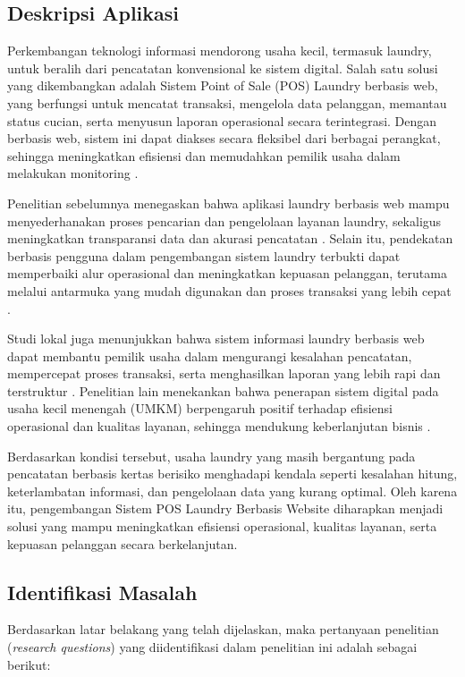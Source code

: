 
\vspace{1cm}
\subsection{Deskripsi Aplikasi}
\indent
Perkembangan teknologi informasi mendorong usaha kecil, termasuk laundry, untuk beralih dari pencatatan konvensional ke sistem digital. Salah satu solusi yang dikembangkan adalah Sistem Point of Sale (POS) Laundry berbasis web, yang berfungsi untuk mencatat transaksi, mengelola data pelanggan, memantau status cucian, serta menyusun laporan operasional secara terintegrasi. Dengan berbasis web, sistem ini dapat diakses secara fleksibel dari berbagai perangkat, sehingga meningkatkan efisiensi dan memudahkan pemilik usaha dalam melakukan monitoring \cite{Achyani2024}.

Penelitian sebelumnya menegaskan bahwa aplikasi laundry berbasis web mampu menyederhanakan proses pencarian dan pengelolaan layanan laundry, sekaligus meningkatkan transparansi data dan akurasi pencatatan \cite{Singh2022}. Selain itu, pendekatan berbasis pengguna dalam pengembangan sistem laundry terbukti dapat memperbaiki alur operasional dan meningkatkan kepuasan pelanggan, terutama melalui antarmuka yang mudah digunakan dan proses transaksi yang lebih cepat \cite{Kalo2023}.

Studi lokal juga menunjukkan bahwa sistem informasi laundry berbasis web dapat membantu pemilik usaha dalam mengurangi kesalahan pencatatan, mempercepat proses transaksi, serta menghasilkan laporan yang lebih rapi dan terstruktur \cite{SigitSugiharto2023}. Penelitian lain menekankan bahwa penerapan sistem digital pada usaha kecil menengah (UMKM) berpengaruh positif terhadap efisiensi operasional dan kualitas layanan, sehingga mendukung keberlanjutan bisnis \cite{Maulana2025}.

Berdasarkan kondisi tersebut, usaha laundry yang masih bergantung pada pencatatan berbasis kertas berisiko menghadapi kendala seperti kesalahan hitung, keterlambatan informasi, dan pengelolaan data yang kurang optimal. Oleh karena itu, pengembangan Sistem POS Laundry Berbasis Website diharapkan menjadi solusi yang mampu meningkatkan efisiensi operasional, kualitas layanan, serta kepuasan pelanggan secara berkelanjutan.

\subsection{Identifikasi Masalah}
\noindent
Berdasarkan latar belakang yang telah dijelaskan, maka pertanyaan penelitian (\textit{research questions}) yang diidentifikasi dalam penelitian ini adalah sebagai berikut:

